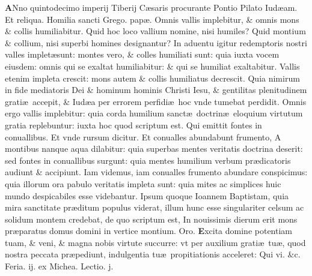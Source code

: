 \documentclass[a5paper,10pt]{book}
\def\rightmarginnote{%
	\lrmarginnote{\hskip\columnwidth \hskip -1em}}
\def\ae{æ}
\begin{document}
\begin{multicols*}{2}
\vspace{-.25em}
\lettrine[lines=2]{\bfseries \color{red} A}{}Nno\rightmarginnote{ca. 3.} quintodecimo imperij Tiberij C\ae saris procurante Pontio Pilato Iud\ae am.
\color{red} Et reliqua.
\newline Homilia sancti Grego. pap\ae . \color{black}
\newline \color{red} O\color{black}mnis vallis implebitur, \& omnis mons \& collis humiliabitur. Quid hoc loco vallium nomine, nisi humiles?
Quid montium \& collium, nisi superbi homines designantur?
In aduentu igitur redemptoris nostri valles implet\ae sunt: montes vero, \& colles humiliati sunt: quia iuxta vocem eiusdem: omnis qui se exaltat humiliabitur: \& qui se humiliat exaltabitur.
Vallis etenim impleta crescit: mons autem \& collis humiliatus decrescit.
Quia nimirum in fide mediatoris Dei \& hominum hominis Christi Iesu, \& gentilitas plenitudinem grati\ae \ accepit, \& Iud\ae a per errorem perfidi\ae \ hoc vnde tumebat perdidit.
Omnis ergo vallis implebitur: quia corda humilium sanct\ae \ doctrin\ae \ eloquium virtutum gratia replebuntur: iuxta hoc quod scriptum est.
Qui emittit fontes in conuallibus. Et vnde rursum dicitur. Et conualles abundabunt frumento, A montibus nanque aqua dilabitur: quia superbas mentes veritatis doctrina deserit: sed fontes in conuallibus surgunt: quia mentes humilium verbum pr\ae dicatoris audiunt \& accipiunt.
Iam videmus, iam conualles frumento abundare conspicimus: quia illorum ora pabulo veritatis impleta sunt: quia mites ac simplices huic mundo despicabiles esse videbantur.
Ipsum quoque Ioannem Baptistam, quia mira sanctitate pr\ae ditum populus viderat, illum hunc esse singulariter celsum ac solidum montem credebat, de quo scriptum est, In nouissimis dierum erit mons pr\ae paratus domus domini in vertice montium. \color{red} Oro. \color{black}
\vspace{-1.25em}
\lettrine[lines=2]{\bfseries \color{red} E}{}xcita domine potentiam tuam, \& veni, \& magna nobis virtute succurre: vt per auxilium grati\ae \ tu\ae , quod nostra peccata pr\ae pediunt, indulgentia tu\ae \ propitiationis acceleret: Qui vi. \&c.
\newline {} \color{red} \hypertarget{MON-QVARTA-ADV}{Feria. ij.} ex Michea. \hfill Lectio. j. \color{black}
\vspace{-.25em}

\end{multicols*}
\end{document}
